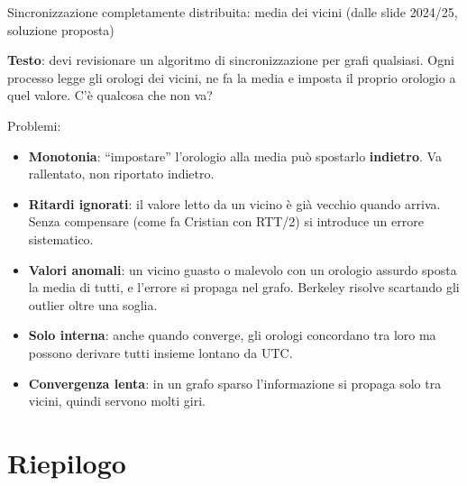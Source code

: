 \begin{approfondimento}{Sincronizzazione completamente distribuita: media dei vicini (dalle
slide 2024/25, soluzione proposta)}

\textbf{Testo}: devi revisionare un algoritmo di sincronizzazione per grafi qualsiasi. Ogni processo legge gli orologi dei vicini, ne fa la media e imposta il proprio orologio a quel valore. C'è qualcosa che non va?

Problemi:

\begin{itemize}
\tightlist
\item
  \textbf{Monotonia}: ``impostare'' l'orologio alla media può spostarlo \textbf{indietro}. Va rallentato, non riportato indietro.
\item
  \textbf{Ritardi ignorati}: il valore letto da un vicino è già vecchio quando arriva. Senza compensare (come fa Cristian con RTT/2) si introduce un errore sistematico.
\item
  \textbf{Valori anomali}: un vicino guasto o malevolo con un orologio assurdo sposta la media di tutti, e l'errore si propaga nel grafo. Berkeley risolve scartando gli outlier oltre una soglia.
\item
  \textbf{Solo interna}: anche quando converge, gli orologi concordano tra loro ma possono derivare tutti insieme lontano da UTC.
\item
  \textbf{Convergenza lenta}: in un grafo sparso l'informazione si propaga solo tra vicini, quindi servono molti giri.
\end{itemize}

\end{approfondimento}

\section{Riepilogo}

